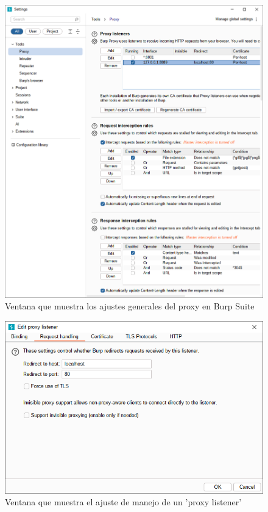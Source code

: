 \documentclass[letter,12pt]{article}
\begin{document}
\begin{figure}
    \centering
    \includegraphics[width=1\linewidth]{levanteyredireccione/Captura desde 2025-10-01 23-12-48.png}
    \caption{Ventana que muestra los ajustes generales del proxy en Burp Suite}
    \label{fig:proxygeneralsetting}
\end{figure}
\begin{figure}
    \centering
    \includegraphics[width=1\linewidth]{levanteyredireccione/Captura desde 2025-10-01 23-12-53.png}
    \caption{Ventana que muestra el ajuste de manejo de un 'proxy listener'}
    \label{fig:placeholder}
\end{figure}
\end{document}

